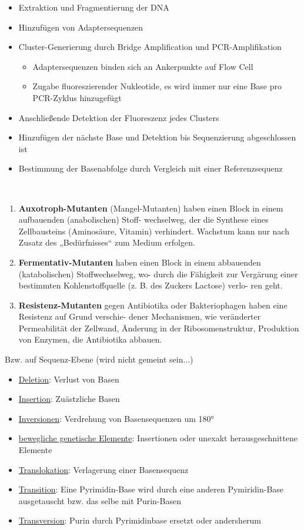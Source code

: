 \begin{itemize}
    \item Extraktion und Fragmentierung der DNA
    \item Hinzufügen von Adaptersequenzen
    \item Cluster-Generierung durch Bridge Amplification und PCR-Amplifikation
    \begin{itemize}
        \item Adaptersequenzen binden sich an Ankerpunkte auf \gls{Flow Cell}
        \item Zugabe fluoreszierender Nukleotide, es wird immer nur eine Base pro PCR-Zyklus hinzugefügt
    \end{itemize}
    \item Anschließende Detektion der Fluoreszenz jedes Clusters
    \item Hinzufügen der nächste Base und Detektion bis Sequenzierung abgeschlossen ist
    \item Bestimmung der Basenabfolge durch Vergleich mit einer Referenzsequenz
\end{itemize}  $\ $ \\

\begin{enumerate}
    \item  \textbf{Auxotroph-Mutanten} (Mangel-Mutanten) haben einen Block in einem aufbauenden (anabolischen) Stoff-
wechselweg, der die Synthese eines Zellbausteins (Aminosäure, Vitamin) verhindert. Wachstum kann nur
nach Zusatz des „Bedürfnisses“ zum Medium erfolgen.
\item \textbf{Fermentativ-Mutanten }haben einen Block in einem abbauenden (katabolischen) Stoffwechselweg, wo-
durch die Fähigkeit zur Vergärung einer bestimmten Kohlenstoffquelle (z. B. des Zuckers Lactose) verlo-
ren geht.
\item \textbf{Resistenz-Mutanten} gegen Antibiotika oder Bakteriophagen haben eine Resistenz auf Grund verschie-
dener Mechanismen, wie veränderter Permeabilität der Zellwand, Änderung in der Ribosomenstruktur,
Produktion von Enzymen, die Antibiotika abbauen.
\end{enumerate}
Bzw. auf Sequenz-Ebene (wird nicht gemeint sein...)
\begin{itemize}
    \item \underline{Deletion}: Verlust von Basen 
    \item \underline{Insertion}: Zuästzliche Basen
    \item \underline{Inversionen}: Verdrehung von Basensequenzen um 180°
    \item \underline{bewegliche genetische Elemente}: Insertionen oder unexakt herausgeschnittene Elemente 
    \item \underline{Translokation}: Verlagerung einer Basensequenz 
    \item \underline{Transition}: Eine Pyrimidin-Base wird durch eine anderen Pymiridin-Base ausgetauscht bzw. das selbe mit Purin-Basen
    \item \underline{Transversion}: Purin durch Pyrimidinbase ersetzt oder andersherum 
\end{itemize}  $\ $ \\

